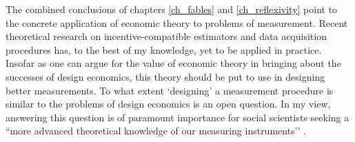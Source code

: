 The combined conclusions of chapters \ref{ch_fables} and \ref{ch_reflexivity} point to the concrete application of economic theory to problems of measurement. Recent theoretical research on incentive-compatible estimators \autocite{caragiannis2016} and data acquisition procedures \autocite{bates2022, roth2012surveys} has, to the best of my knowledge, yet to be applied in practice. Insofar as one can argue for the value of economic theory in bringing about the successes of design economics, this theory should be put to use in designing better measurements. To what extent `designing' a measurement procedure is similar to the problems of design economics is an open question. In my view, answering this question is of paramount importance for social scientists seeking a  ``more advanced theoretical knowledge of our measuring instruments’’ \autocite[1231]{achen1975}.